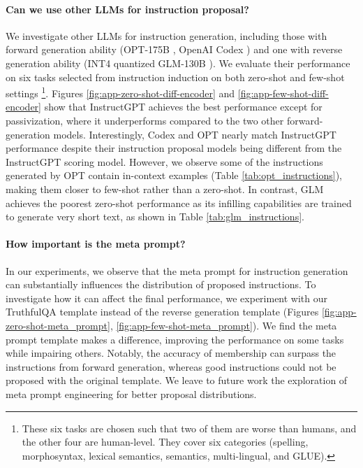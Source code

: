 \paragraph{Can we use other LLMs for instruction proposal?} We investigate other LLMs for instruction generation, including those with forward generation ability (OPT-175B \citep{zhang2022opt}, OpenAI Codex \citep{chen2021evaluating}) and one with reverse generation ability (INT4 quantized GLM-130B \citep{glm130b}).
We evaluate their performance on six tasks selected from instruction induction on both zero-shot and few-shot settings \footnote{These six tasks are chosen such that two of them are worse than humans, and the other four are human-level. They cover six categories (spelling, morphosyntax, lexical semantics, semantics, multi-lingual, and GLUE).\label{sixtasks}}. Figures \ref{fig:app-zero-shot-diff-encoder} and \ref{fig:app-few-shot-diff-encoder} show that InstructGPT achieves the best performance except for passivization, where it underperforms compared to the two other forward-generation models. Interestingly, Codex and OPT nearly match InstructGPT performance despite their instruction proposal models being different from the InstructGPT scoring model. However, we observe some of the instructions generated by OPT contain in-context examples (Table \ref{tab:opt_instructions}), making them closer to few-shot rather than a zero-shot. In contrast, GLM achieves the poorest zero-shot performance as its infilling capabilities are trained to generate very short text, as shown in Table \ref{tab:glm_instructions}. 

\paragraph{How important is the meta prompt?} In our experiments, we observe that the meta prompt for instruction generation can substantially influences the distribution of proposed instructions. To investigate how it can affect the final performance, we experiment with our TruthfulQA template instead of the reverse generation template (Figures \ref{fig:app-zero-shot-meta_prompt}, \ref{fig:app-few-shot-meta_prompt}). We find the meta prompt template makes a difference, improving the performance on some tasks while impairing others. Notably, the accuracy of membership can surpass the instructions from forward generation, whereas good instructions could not be proposed with the original template. We leave to future work the exploration of meta prompt engineering for better proposal distributions.

